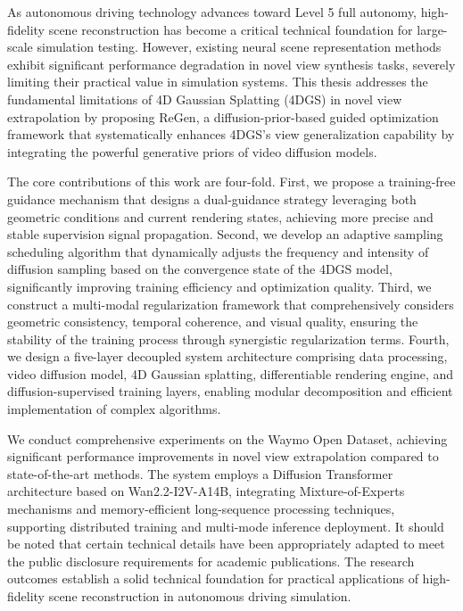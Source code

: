 \begin{abstract*}
  As autonomous driving technology advances toward Level 5 full autonomy, high-fidelity scene reconstruction has become a critical technical foundation for large-scale simulation testing. However, existing neural scene representation methods exhibit significant performance degradation in novel view synthesis tasks, severely limiting their practical value in simulation systems. This thesis addresses the fundamental limitations of 4D Gaussian Splatting (4DGS) in novel view extrapolation by proposing ReGen, a diffusion-prior-based guided optimization framework that systematically enhances 4DGS's view generalization capability by integrating the powerful generative priors of video diffusion models.

  The core contributions of this work are four-fold. First, we propose a training-free guidance mechanism that designs a dual-guidance strategy leveraging both geometric conditions and current rendering states, achieving more precise and stable supervision signal propagation. Second, we develop an adaptive sampling scheduling algorithm that dynamically adjusts the frequency and intensity of diffusion sampling based on the convergence state of the 4DGS model, significantly improving training efficiency and optimization quality. Third, we construct a multi-modal regularization framework that comprehensively considers geometric consistency, temporal coherence, and visual quality, ensuring the stability of the training process through synergistic regularization terms. Fourth, we design a five-layer decoupled system architecture comprising data processing, video diffusion model, 4D Gaussian splatting, differentiable rendering engine, and diffusion-supervised training layers, enabling modular decomposition and efficient implementation of complex algorithms.

  We conduct comprehensive experiments on the Waymo Open Dataset, achieving significant performance improvements in novel view extrapolation compared to state-of-the-art methods. The system employs a Diffusion Transformer architecture based on Wan2.2-I2V-A14B, integrating Mixture-of-Experts mechanisms and memory-efficient long-sequence processing techniques, supporting distributed training and multi-mode inference deployment. It should be noted that certain technical details have been appropriately adapted to meet the public disclosure requirements for academic publications. The research outcomes establish a solid technical foundation for practical applications of high-fidelity scene reconstruction in autonomous driving simulation.

\end{abstract*}
